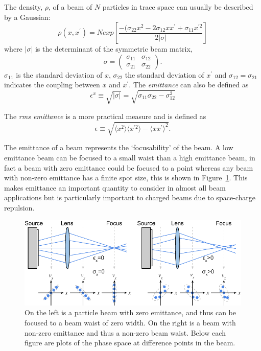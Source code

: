 The density, $\rho$, of a beam of $N$ particles in trace space can usually be described by a Gaussian:
\begin{equation}\label{trace_space_density}
\rho(x, x^\prime) = N exp\left[ \frac{-(\sigma_{22}x^2-2\sigma_{12}xx^\prime+\sigma_{11}x^{\prime2}}{2|\sigma|} \right]
\end{equation}
where $|\sigma|$ is the determinant of the symmetric beam matrix,
\begin{equation}
\sigma = \begin{pmatrix} \sigma_{11} & \sigma_{12} \\ \sigma_{21} & \sigma_{22} \end{pmatrix}.
\end{equation}
$\sigma_{11}$ is the standard deviation of $x$, $\sigma_{22}$ the standard deviation of $x^\prime$ and $\sigma_{12}=\sigma_{21}$ indicates the coupling between $x$ and $x^\prime$. The \emph{emittance} can also be defined as
\begin{equation}\label{eq:emittancewithdeterminant}
\epsilon^x \equiv \sqrt{|\sigma|} = \sqrt{\sigma_{11}\sigma_{22}-\sigma_{12}^2}
\end{equation}

The \emph{\gls{rms} emittance} is a more practical measure and is defined as
\begin{equation}\label{emittance}
\epsilon \equiv \sqrt{\langle x^2\rangle \langle x^{\prime 2}\rangle - \langle x x^\prime\rangle^2}.
\end{equation}

The emittance of a beam represents the `focusability' of the beam.
A low emittance beam can be focused to a small waist than a high emittance beam, in fact a beam with zero emittance could be focused to a point whereas any beam with non-zero emittance has a finite spot size, this is shown in Figure~\ref{figure:focusability}.
This makes emittance an important quantity to consider in almost all beam applications but is particularly important to charged beams due to space-charge repulsion.

\begin{figure}
\center
\includegraphics{part2/Figs/EmittanceFocasability.pdf}
\caption{On the left is a particle beam with zero emittance, and thus can be focused to a beam waist of zero width. On the right is a beam with non-zero emittance and thus a non-zero beam waist. Below each figure are plots of the phase space at difference points in the beam.}
\label{figure:focusability}
\end{figure}

